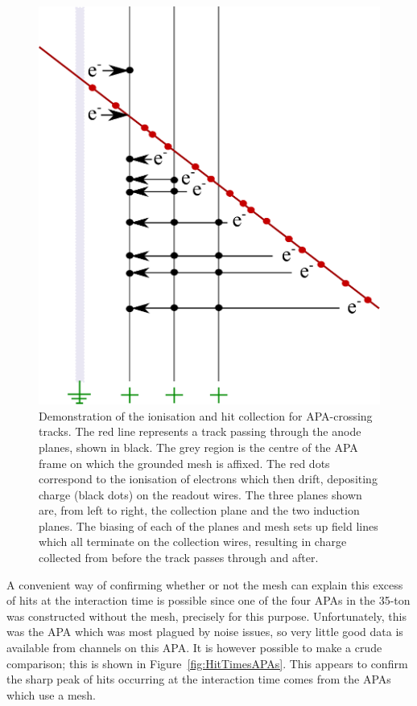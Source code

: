 \begin{figure}
  \centering
  \includegraphics[width=12cm]{MeshHits.eps}
  \caption[Demonstration of the electron ionisation and hit collection for APA-crossing tracks.]{Demonstration of the ionisation and hit collection for APA-crossing tracks.  The red line represents a track passing through the anode planes, shown in black.  The grey region is the centre of the APA frame on which the grounded mesh is affixed.  The red dots correspond to the ionisation of electrons which then drift, depositing charge (black dots) on the readout wires.  The three planes shown are, from left to right, the collection plane and the two induction planes.  The biasing of each of the planes and mesh sets up field lines which all terminate on the collection wires, resulting in charge collected from before the track passes through and after.}
  \label{fig:MeshHits}
\end{figure}

A convenient way of confirming whether or not the mesh can explain this excess of hits at the interaction time is possible since one of the four APAs in the 35-ton was constructed without the mesh, precisely for this purpose.  Unfortunately, this was the APA which was most plagued by noise issues, so very little good data is available from channels on this APA.  It is however possible to make a crude comparison; this is shown in Figure~\ref{fig:HitTimesAPAs}.  This appears to confirm the sharp peak of hits occurring at the interaction time comes from the APAs which use a mesh.

